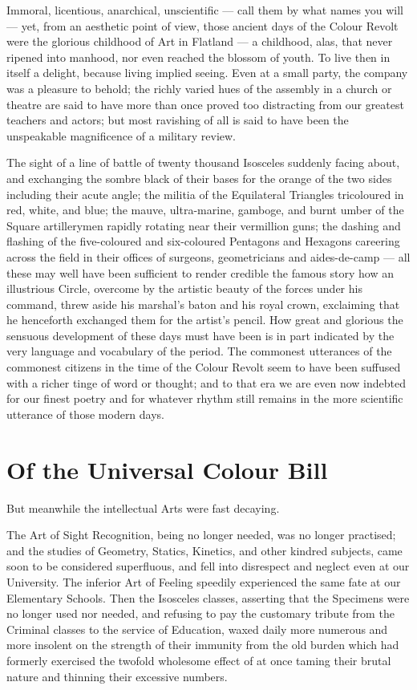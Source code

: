 \documentclass[12pt, a4paper, oneside]{memoir}
\begin{document}
Immoral, licentious, anarchical, unscientific --- call them by what names you
will --- yet, from an aesthetic point of view, those ancient days of the Colour
Revolt were the glorious childhood of Art in Flatland --- a childhood, alas,
that never ripened into manhood, nor even reached the blossom of youth. To
live then in itself a delight, because living implied seeing. Even at a small
party, the company was a pleasure to behold; the richly varied hues of the
assembly in a church or theatre are said to have more than once proved too
distracting from our greatest teachers and actors; but most ravishing of all
is said to have been the unspeakable magnificence of a military review.

The sight of a line of battle of twenty thousand
Isosceles suddenly facing about, and exchanging the sombre black of their
bases for the orange of the two sides including their acute angle; the militia
of the Equilateral Triangles tricoloured in red, white, and blue; the mauve,
ultra-marine, gamboge, and burnt umber of the Square artillerymen rapidly
rotating near their vermillion guns; the dashing and flashing of the
five-coloured and six-coloured Pentagons and Hexagons careering across the
field in their offices of surgeons, geometricians and aides-de-camp --- all
these may well have been sufficient to render credible the famous story how an
illustrious Circle, overcome by the artistic beauty of the forces under his
command, threw aside his marshal's baton and his royal crown, exclaiming that
he henceforth exchanged them for the artist's pencil. How great and glorious
the sensuous development of these days must have been is in part indicated by
the very language and vocabulary of the period. The commonest utterances of
the commonest citizens in the time of the Colour Revolt seem to have been
suffused with a richer tinge of word or thought; and to that era we are even
now indebted for our finest poetry and for whatever rhythm still remains in
the more scientific utterance of those modern days.


\chapter{Of the Universal Colour Bill}
But meanwhile the intellectual Arts were fast decaying.

The Art of Sight Recognition, being no longer needed, was no longer practised;
and the studies of Geometry, Statics, Kinetics, and other kindred subjects,
came soon to be considered superfluous, and fell into disrespect and neglect
even at our University. The inferior Art of Feeling speedily experienced the
same fate at our Elementary Schools. Then the Isosceles classes, asserting
that the Specimens were no longer used nor needed, and refusing to pay the
customary tribute from the Criminal classes to the service of Education, waxed
daily more numerous and more insolent on the strength of their immunity from
the old burden which had formerly exercised the twofold wholesome effect of at
once taming their brutal nature and thinning their excessive numbers.
\end{document}
